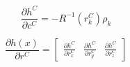 \begin{equation}
\frac{\partial h^{C}}{\partial c^{C}}=-R^{-1}(r_{k}^{C})\rho _{k}
\end{equation}

\begin{equation}
\frac{\partial h(x)}{\partial r^{C}}=\begin{bmatrix} 
\frac{\partial h^{C}}{\partial r_{x}^{C}} & 
\frac{\partial h^{C}}{\partial r_{y}^{C}} & 
\frac{\partial h^{C}}{\partial r_{z}^{C}}\end{bmatrix}
\end{equation}





